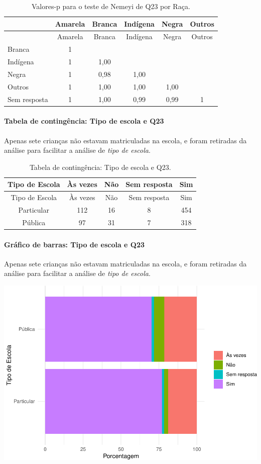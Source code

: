\documentclass[]{article}
\let\oldparagraph\paragraph
\renewcommand{\paragraph}[1]{\oldparagraph{#1}\mbox{}}
\begin{document}
\begin{longtable}[]{@{}lccccc@{}}
\caption{\label{tab:unnamed-chunk-583}Valores-p para o teste de Nemeyi de Q23 por Raça.}\tabularnewline
\toprule
& Amarela & Branca & Indígena & Negra & Outros\tabularnewline
\midrule
\endfirsthead
\toprule
& Amarela & Branca & Indígena & Negra & Outros\tabularnewline
\midrule
\endhead
Branca & 1 & & & &\tabularnewline
Indígena & 1 & 1,00 & & &\tabularnewline
Negra & 1 & 0,98 & 1,00 & &\tabularnewline
Outros & 1 & 1,00 & 1,00 & 1,00 &\tabularnewline
Sem resposta & 1 & 1,00 & 0,99 & 0,99 & 1\tabularnewline
\bottomrule
\end{longtable}

\cleardoublepage

\hypertarget{tabela-de-continguxeancia-tipo-de-escola-e-q23}{%
\paragraph{Tabela de contingência: Tipo de escola e Q23}\label{tabela-de-continguxeancia-tipo-de-escola-e-q23}}

Apenas sete crianças não estavam matriculadas na escola, e foram retiradas da análise para facilitar a análise de \emph{tipo de escola}.

\begin{longtable}[]{@{}ccccc@{}}
\caption{\label{tab:unnamed-chunk-584}Tabela de contingência: Tipo de escola e Q23.}\tabularnewline
\toprule
Tipo de Escola & Às vezes & Não & Sem resposta & Sim\tabularnewline
\midrule
\endfirsthead
\toprule
Tipo de Escola & Às vezes & Não & Sem resposta & Sim\tabularnewline
\midrule
\endhead
Particular & 112 & 16 & 8 & 454\tabularnewline
Pública & 97 & 31 & 7 & 318\tabularnewline
\bottomrule
\end{longtable}

\hypertarget{gruxe1fico-de-barras-tipo-de-escola-e-q23}{%
\paragraph{Gráfico de barras: Tipo de escola e Q23}\label{gruxe1fico-de-barras-tipo-de-escola-e-q23}}

Apenas sete crianças não estavam matriculadas na escola, e foram retiradas da análise para facilitar a análise de \emph{tipo de escola}.

\begin{center}\includegraphics[width=0.75\linewidth]{relatorio_covid19_files/figure-latex/unnamed-chunk-585-1} \end{center}
\end{document}
